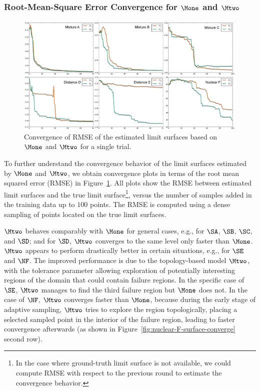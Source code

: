 \subsubsection{Root-Mean-Square Error Convergence for $\protect\Mone$ and $\protect\Mtwo$}

\begin{figure}[!ht]
\centering
\includegraphics[width=1.0\textwidth]{figs/chap5/RMSE-convergence.pdf}
\caption{Convergence of RMSE of the estimated limit surfaces based on $\protect\Mone$ and $\protect\Mtwo$ for a single trial.}
\label{fig:RMSE-convergence}
\end{figure}

To further understand the convergence behavior of the limit surfaces estimated by $\Mone$ and $\Mtwo$, we obtain convergence plots in terms of the root mean squared error (RMSE) in Figure~\ref{fig:RMSE-convergence}.
%
All plots show the RMSE between estimated limit surfaces and the true limit surface\footnote{In the case where ground-truth limit surface is not available, we could compute RMSE with respect to the previous round to estimate the convergence behavior.}, versus the number of samples added in the training data up to $100$ points.
%
The RMSE is computed using a dense sampling of points located on the true limit surfaces.

$\Mtwo$ behaves comparably with $\Mone$ for general cases, e.g., for $\SA$, $\SB$, $\SC$, and $\SD$; and for $\SD$, $\Mtwo$ converges to the same level only faster than $\Mone$.
%
$\Mtwo$ appears to perform drastically better in certain situations, e.g., for $\SE$ and $\NF$.
%
The improved performance is due to the topology-based model $\Mtwo$, with the tolerance parameter allowing exploration of potentially interesting regions of the domain that could contain failure regions.
%
In the specific case of $\SE$, $\Mtwo$ manages to find the third failure region but $\Mone$ does not.
%
In the case of $\NF$, $\Mtwo$ converges faster than $\Mone$, because during the early stage of adaptive sampling, $\Mtwo$ tries to explore the region topologically, placing a selected sampled point in the interior of the failure region, leading to faster convergence afterwards (as shown in Figure~\ref{fig:nuclear-F-surface-converge} second row).

